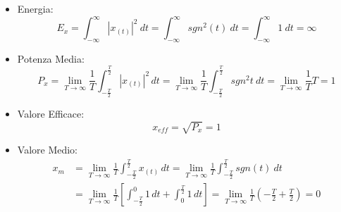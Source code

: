         \begin{itemize}
            \item {Energia:
                \[
                    E_{x} = \int_{-\infty}^{\infty} |x_{(t)}|^2 \ dt = \int_{-\infty}^{\infty} sgn^2(t)\ dt = \int_{-\infty}^{\infty} 1\ dt =\infty 
                \]
            }
            \item {Potenza Media:
                \[
                    P_{x} =\lim_{T\rightarrow\infty}  \frac{1}{T} \int_{-\frac{T}{2}}^{\frac{T}{2}}  |x_{(t)}|^2 \,dt =\lim_{T\rightarrow\infty} \frac{1}{T} \int_{-\frac{T}{2}}^{\frac{T}{2}} sgn^2{t}\ dt = \lim_{T\rightarrow\infty} \frac{1}{T} T = 1
                \]
            }
            \item {Valore Efficace:
                \[
                    x_{eff} = \sqrt{P_{x}} = 1 
                \]
            }
            \item {Valore Medio:
                \begin{align}
                    x_{m} & = \lim_{T\rightarrow\infty} \frac{1}{T} \int_{-\frac{T}{2}}^{\frac{T}{2}}  x_{(t)} \,dt =\lim_{T\rightarrow\infty} \frac{1}{T} \int_{-\frac{T}{2}}^{\frac{T}{2}} sgn(t)\ dt \nonumber \\
                          & = \lim_{T\rightarrow\infty} \frac{1}{T} \left[\int_{-\frac{T}{2}}^{0}  1\,dt + \int_{0}^{\frac{T}{2}}  1\,dt\right] = \lim_{T\rightarrow\infty} \frac{1}{T} \left(-\frac{T}{2}+\frac{T}{2}\right) = 0 \nonumber
                \end{align}        
            }
        \end{itemize}
        
